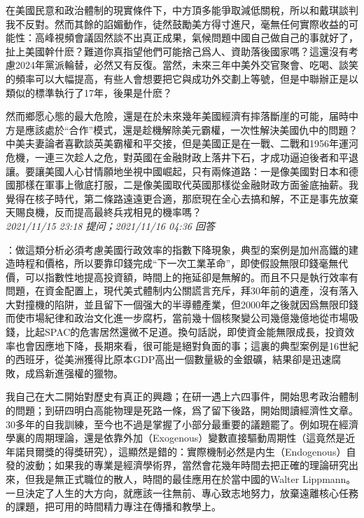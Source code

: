 \documentclass[twocolumn]{ctexart}
\begin{document}
在美國民意和政治體制的現實條件下，中方頂多能爭取減低關稅，所以和戴琪談判我不反對。然而其餘的諂媚動作，徒然鼓勵美方得寸進尺，毫無任何實際收益的可能性：高峰視頻會議固然談不出真正成果，氣候問題中國自己做自己的事就好了，扯上美國幹什麽？難道你真指望他們可能捨己爲人、資助落後國家嗎？這還沒有考慮2024年黨派輪替，必然又有反復。當然，未來三年中美外交官聚會、吃喝、談笑的頻率可以大幅提高，有些人會想要把它與成功外交劃上等號，但是中聯辦正是以類似的標準執行了17年，後果是什麽？

然而鄉愿心態的最大危險，還是在於未來幾年美國經濟有摔落斷崖的可能，届時中方是應該處於“合作”模式，還是趁機解除美元霸權，一次性解決美國仇中的問題？中美夫妻論者喜歡談英美霸權和平交接，但是美國正是在一戰、二戰和1956年運河危機，一連三次趁人之危，對英國在金融財政上落井下石，才成功逼迫後者和平退讓。要讓美國人心甘情願地坐視中國崛起，只有兩條道路：一是像美國對日本和德國那樣在軍事上徹底打服，二是像美國取代英國那樣從金融財政方面釜底抽薪。我覺得在核子時代，第二條路遠遠更合適，那麽現在全心去搞和解，不正是事先放棄天賜良機，反而提高最終兵戎相見的機率嗎？
\\

\textit{\hfill\noindent\small 2021/11/15 23:18 提问；2021/11/16 04:36 回答}

：做這類分析必須考慮美國行政效率的指數下降現象，典型的案例是加州高鐵的建造時程和價格，所以要靠印錢完成“下一次工業革命”，即使假設無限印錢毫無代價，可以指數性地提高投資額，時間上的拖延卻是無解的。而且不只是執行效率有問題，在資金配置上，現代美式體制内公關謊言充斥，拜30年前的遺產，沒有落入大對撞機的陷阱，並且留下一個强大的半導體產業，但2000年之後就因爲無限印錢而使市場紀律和政治文化進一步腐朽，當前幾十個核聚變公司幾億幾億地從市場吸錢，比起SPAC的危害居然還微不足道。換句話説，即使資金能無限成長，投資效率也會因應地下降，長期來看，很可能是絕對負面的事；這裏的典型案例是16世紀的西班牙，從美洲獲得比原本GDP高出一個數量級的金銀礦，結果卻是迅速腐敗，成爲新進强權的獵物。

我自己在大二開始對歷史有真正的興趣；在研一遇上六四事件，開始思考政治體制的問題；到研四明白高能物理是死路一條，爲了留下後路，開始閲讀經濟性文章。30多年的自我訓練，至今也不過是掌握了小部分最重要的議題罷了。例如現在經濟學裏的周期理論，還是依靠外加（Exogenous）變數直接驅動周期性（這竟然是近年諾貝爾獎的得獎研究），這顯然是錯的：實際機制必然是内生（Endogenous）自發的波動；如果我的專業是經濟學術界，當然會花幾年時間去把正確的理論研究出來，但我是無正式職位的散人，時間的最佳應用在於當中國的Walter Lippmann。一旦決定了人生的大方向，就應該一往無前、專心致志地努力，放棄遠離核心任務的課題，把可用的時間精力專注在傳播和教學上。
\end{document}
